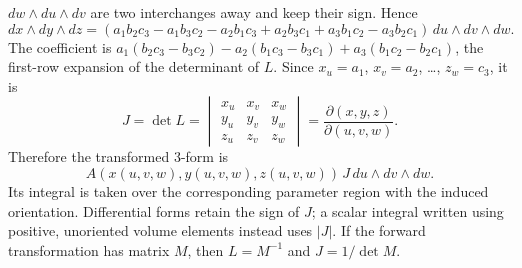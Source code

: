 $dw\wedge du\wedge dv$ are two interchanges away and keep their sign.
Hence
\[
dx\wedge dy\wedge dz
=(a_1b_2c_3-a_1b_3c_2-a_2b_1c_3+a_2b_3c_1
     +a_3b_1c_2-a_3b_2c_1)\,du\wedge dv\wedge dw.
\]
The coefficient is
$a_1(b_2c_3-b_3c_2)-a_2(b_1c_3-b_3c_1)+a_3(b_1c_2-b_2c_1)$, the
first-row expansion of the determinant of $L$. Since $x_u=a_1$,
$x_v=a_2$, \dots, $z_w=c_3$, it is
\[
J=\det L
=\begin{vmatrix}x_u&x_v&x_w\\y_u&y_v&y_w\\z_u&z_v&z_w\end{vmatrix}
=\frac{\partial(x,y,z)}{\partial(u,v,w)}.
\]
Therefore the transformed 3-form is
\[
\boxed{A(x(u,v,w),y(u,v,w),z(u,v,w))\,J\,du\wedge dv\wedge dw}.
\]
Its integral is taken over the corresponding parameter region with the
induced orientation. Differential forms retain the sign of $J$;
a scalar integral written using positive, unoriented volume elements
instead uses $|J|$. If the forward transformation has matrix $M$,
then $L=M^{-1}$ and $J=1/\det M$.

